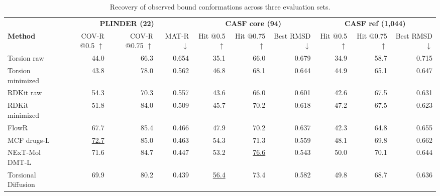 \begin{table}[htbp]
\centering\footnotesize
\setlength{\tabcolsep}{2pt}
\renewcommand{\arraystretch}{1.35}
\caption{Recovery of observed bound conformations across three evaluation sets.}
\label{tab:count-recovery}
\par\smallskip
\begin{tabular*}{\linewidth}{@{\extracolsep{\fill}}lrrr@{\hspace{8pt}}rrr@{\hspace{8pt}}rrr@{}}
\toprule
 & \multicolumn{3}{c}{\textcolor{plinderTeal}{\textbf{PLINDER (22)}}} & \multicolumn{3}{c}{\textbf{CASF core (94)}} & \multicolumn{3}{c}{\textbf{CASF ref (1,044)}} \\
\cmidrule(lr){2-4}\cmidrule(lr){5-7}\cmidrule(l){8-10}
\textbf{Method} & \shortstack{COV-R\\@0.5 $\uparrow$} & \shortstack{COV-R\\@0.75 $\uparrow$} & MAT-R $\downarrow$ & \shortstack{Hit\\@0.5 $\uparrow$} & \shortstack{Hit\\@0.75 $\uparrow$} & \shortstack{Best\\RMSD $\downarrow$} & \shortstack{Hit\\@0.5 $\uparrow$} & \shortstack{Hit\\@0.75 $\uparrow$} & \shortstack{Best\\RMSD $\downarrow$} \\
\midrule
\rowcolor{tableShade}
Torsion raw & 44.0 & 66.3 & 0.654 & 35.1 & 66.0 & 0.679 & 34.9 & 58.7 & 0.715 \\
Torsion minimized & 43.8 & 78.0 & 0.562 & 46.8 & 68.1 & 0.644 & 44.9 & 65.1 & 0.647 \\
\rowcolor{tableShade}
RDKit raw & 54.3 & 70.3 & 0.557 & 43.6 & 66.0 & 0.601 & 42.6 & 67.5 & 0.631 \\
RDKit minimized & 51.8 & 84.0 & 0.509 & 45.7 & 70.2 & 0.618 & 47.2 & 67.5 & 0.623 \\
\rowcolor{tableShade}
FlowR & 67.7 & 85.4 & 0.466 & 47.9 & 70.2 & 0.637 & 42.3 & 64.8 & 0.655 \\
MCF drugs-L & \underline{72.7} & 85.0 & 0.463 & 54.3 & 71.3 & 0.559 & 48.1 & 69.8 & 0.662 \\
\rowcolor{tableShade}
NExT-Mol DMT-L & 71.6 & 84.7 & 0.447 & 53.2 & \underline{76.6} & 0.543 & 50.0 & 70.1 & 0.644 \\
Torsional Diffusion & 69.9 & 80.2 & 0.439 & \underline{56.4} & 73.4 & 0.582 & 49.8 & 68.7 & 0.636 \\

\end{tabular*}
\end{table}
